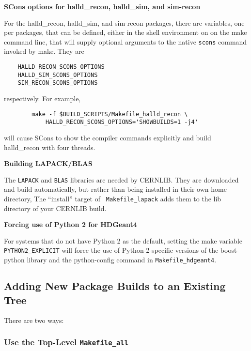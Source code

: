\documentclass[12pt, letterpaper]{article}
\begin{document}
\begin{description}

\item{\bf SCons options for halld\_recon, halld\_sim, and sim-recon}

For the halld\_recon, halld\_sim, and sim-recon packages, there are variables, one per packages, that can be defined, either in the shell
environment on on the make command line, that will supply optional
arguments to the native {\tt scons} command invoked by make. They are
\begin{verbatim}
    HALLD_RECON_SCONS_OPTIONS
    HALLD_SIM_SCONS_OPTIONS
    SIM_RECON_SCONS_OPTIONS
\end{verbatim}
respectively. For example,
\begin{verbatim}
        make -f $BUILD_SCRIPTS/Makefile_halld_recon \
            HALLD_RECON_SCONS_OPTIONS='SHOWBUILDS=1 -j4'
\end{verbatim}
will cause SCons to show the compiler commands explicitly and build halld\_recon with four threads.

\item{\bf Building LAPACK/BLAS}

The {\tt LAPACK} and {\tt BLAS} libraries are needed by CERNLIB. They
are downloaded and build automatically, but rather than being
installed in their own home directory, The ``install'' target of {\tt
  Makefile\_lapack} adds them to the lib directory of your CERNLIB
build.

\item{\bf Forcing use of Python 2 for HDGeant4}

For systems that do not have Python 2 as the default, setting the make variable {\tt PYTHON2\_EXPLICIT} will force the use of Python-2-specific versions of the boost-python library and the python-config command in {\tt Makefile\_hdgeant4}.

\end{description}

\subsection{Adding New Package Builds to an Existing Tree}\label{section:adding-packages}

There are two ways:

\subsubsection{Use the Top-Level {\tt Makefile\_all}}
\end{document}
